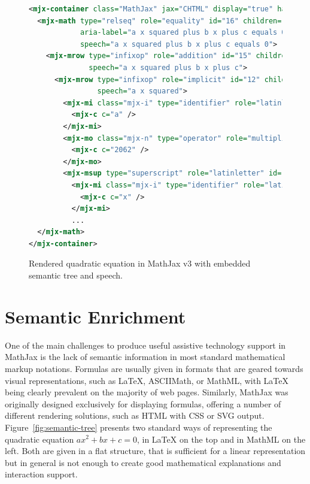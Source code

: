 \documentclass{sig-alternate}
\begin{document}
\begin{figure}[ht!]
  \begin{lstlisting}[language=XML,basicstyle=\scriptsize\tt]
<mjx-container class="MathJax" jax="CHTML" display="true" hasspeech="true" tabindex="1">
  <mjx-math type="relseq" role="equality" id="16" children="15,10" content="9"
            aria-label="a x squared plus b x plus c equals 0" 
            speech="a x squared plus b x plus c equals 0">
    <mjx-mrow type="infixop" role="addition" id="15" children="12,14,8" content="4,7" parent="16"
              speech="a x squared plus b x plus c">
      <mjx-mrow type="infixop" role="implicit" id="12" children="0,3" content="11" parent="15"
                speech="a x squared">
        <mjx-mi class="mjx-i" type="identifier" role="latinletter" font="italic" id="0" parent="12" speech="a">
          <mjx-c c="a" />
        </mjx-mi>
        <mjx-mo class="mjx-n" type="operator" role="multiplication" id="11" parent="12" speech="times">
          <mjx-c c="2062" />
        </mjx-mo>
        <mjx-msup type="superscript" role="latinletter" id="3" children="1,2" parent="12" speech="x squared">
          <mjx-mi class="mjx-i" type="identifier" role="latinletter" font="italic" id="1" parent="3" speech="x">
            <mjx-c c="x" />
          </mjx-mi>
          ...
  </mjx-math>
</mjx-container>
\end{lstlisting}
\caption{Rendered quadratic equation in MathJax v3 with embedded
  semantic tree and speech.}
\label{fig:rendered}
\end{figure}



\section{Semantic Enrichment}
\label{sec:semantic-enrichment}

One of the main challenges to produce useful assistive technology support in
MathJax is the lack of semantic information in most standard mathematical markup
notations. Formulas are usually given in formats that are geared towards visual
representations, such as {\LaTeX}, ASCIIMath, or MathML, with {\LaTeX} being
clearly prevalent on the majority of web pages. Similarly, MathJax was originally
designed exclusively for displaying formulas, offering a number of different
rendering solutions, such as HTML with CSS or SVG output.
Figure~\ref{fig:semantic-tree} presents two standard ways of representing the
quadratic equation $ax^2 + bx + c = 0$, in {\LaTeX} on the top and in MathML on
the left. Both are given in a flat structure, that is sufficient for a linear
representation but in general is not enough to create good mathematical
explanations and interaction support.
\end{document}
